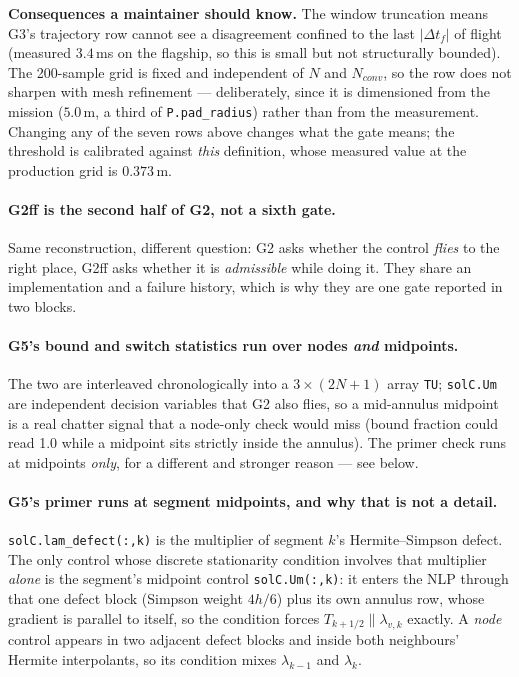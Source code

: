 \documentclass[11pt]{article}
\begin{document}
\textbf{Consequences a maintainer should know.} The window truncation means
G3's trajectory row cannot see a disagreement confined to the last
$|\Delta t_f|$ of flight (measured $3.4$\,ms on the flagship, so this is
small but not structurally bounded). The 200-sample grid is fixed and
independent of $N$ and $N_{conv}$, so the row does not sharpen with mesh
refinement --- deliberately, since it is dimensioned from the mission
($5.0$\,m, a third of \texttt{P.pad\_radius}) rather than from the
measurement. Changing any of the seven rows above changes what the gate
means; the threshold is calibrated against \emph{this} definition, whose
measured value at the production grid is $0.373$\,m.

\paragraph{G2ff is the second half of G2, not a sixth gate.} Same
reconstruction, different question: G2 asks whether the control \emph{flies}
to the right place, G2ff asks whether it is \emph{admissible} while doing
it. They share an implementation and a failure history, which is why they
are one gate reported in two blocks.

\paragraph{G5's bound and switch statistics run over nodes \emph{and}
midpoints.} The two are interleaved chronologically into a $3\times(2N{+}1)$
array \texttt{TU}; \texttt{solC.Um} are independent decision variables that
G2 also flies, so a mid-annulus midpoint is a real chatter signal that a
node-only check would miss (bound fraction could read 1.0 while a midpoint
sits strictly inside the annulus). The primer check runs at midpoints
\emph{only}, for a different and stronger reason --- see below.

\paragraph{G5's primer runs at segment midpoints, and why that is not a
detail.} \texttt{solC.lam\_defect(:,k)} is the multiplier of segment $k$'s
Hermite--Simpson defect. The only control whose discrete stationarity
condition involves that multiplier \emph{alone} is the segment's midpoint
control \texttt{solC.Um(:,k)}: it enters the NLP through that one defect
block (Simpson weight $4h/6$) plus its own annulus row, whose gradient is
parallel to itself, so the condition forces $T_{k+1/2} \parallel
\lambda_{v,k}$ exactly. A \emph{node} control appears in two adjacent defect
blocks and inside both neighbours' Hermite interpolants, so its condition
mixes $\lambda_{k-1}$ and $\lambda_k$.
\end{document}
